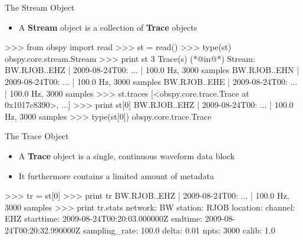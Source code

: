 \documentclass[handout]{beamer}
\begin{document}
\begin{frame}{The Stream Object}
 \begin{itemize}
     \item A \textbf{Stream} object is a collection of \textbf{Trace} objects
 \end{itemize}

\begin{myColorBox}{0.95}{}
\begin{python}
>>> from obspy import read
>>> st = read()
>>> type(st)
obspy.core.stream.Stream
>>> print st
3 Trace(s) (*@in@*) Stream:
BW.RJOB..EHZ | 2009-08-24T00: ... | 100.0 Hz, 3000 samples
BW.RJOB..EHN | 2009-08-24T00: ... | 100.0 Hz, 3000 samples
BW.RJOB..EHE | 2009-08-24T00: ... | 100.0 Hz, 3000 samples
>>> st.traces
[<obspy.core.trace.Trace at 0x1017c8390>, ...]
>>> print st[0]
BW.RJOB..EHZ | 2009-08-24T00: ... | 100.0 Hz, 3000 samples
>>> type(st[0])
obspy.core.trace.Trace
\end{python}
\end{myColorBox}

\end{frame}

\begin{frame}{The Trace Object}

 \begin{itemize}
     \item A \textbf{Trace} object is a single, continuous waveform data block
     \item It furthermore contains a limited amount of metadata
 \end{itemize}


\begin{myColorBox}{0.95}{}
\begin{python}
>>> tr = st[0]
>>> print tr
BW.RJOB..EHZ | 2009-08-24T00: ... | 100.0 Hz, 3000 samples
>>> print tr.stats
         network: BW
         station: RJOB
        location:
         channel: EHZ
       starttime: 2009-08-24T00:20:03.000000Z
         endtime: 2009-08-24T00:20:32.990000Z
   sampling_rate: 100.0
           delta: 0.01
            npts: 3000
           calib: 1.0
\end{python}
\end{myColorBox}

\end{frame}
\end{document}
